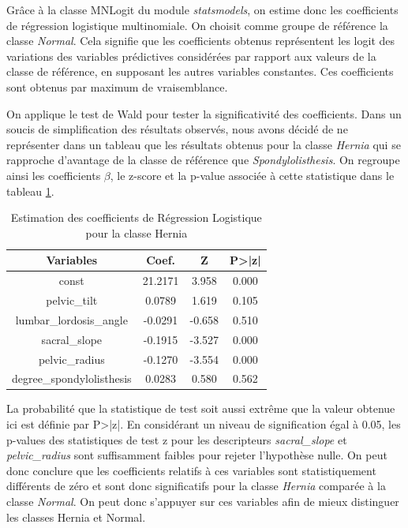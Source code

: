 \documentclass[twocolumn,10pt]{article}
\begin{document}
Grâce à la classe MNLogit du module \textit{statsmodels}, on estime donc les coefficients de régression logistique multinomiale. On choisit comme groupe de référence la classe \textit{Normal}. Cela signifie que les coefficients obtenus représentent les logit des variations des variables prédictives considérées par rapport aux valeurs de la classe de référence, en supposant les autres variables constantes. Ces coefficients sont obtenus par maximum de vraisemblance.

On applique le test de Wald pour tester la significativité des coefficients. Dans un soucis de simplification des résultats observés, nous avons décidé de ne représenter dans un tableau que les résultats obtenus pour la classe \textit{Hernia} qui se rapproche d'avantage de la classe de référence que \textit{Spondylolisthesis}. On regroupe ainsi les coefficients $\beta$, le z-score et la p-value associée à cette statistique dans le tableau \ref{tab:interpretations_coef_Hernia}.

\begin{table}[htbp]
    \begin{center}
        \caption{\label{tab:interpretations_coef_Hernia} Estimation des coefficients de Régression Logistique pour la classe Hernia}
        \begin{tabular}{c|ccc}
            Variables & Coef. & Z & P>|z| \\
            \hline
            const & 21.2171 & 3.958 & 0.000 \\
            pelvic\_tilt & 0.0789 & 1.619	 & 0.105\\
            lumbar\_lordosis\_angle & -0.0291 & -0.658 & 0.510\\
            sacral\_slope & -0.1915 & -3.527	& 0.000 \\
            pelvic\_radius & -0.1270 & -3.554 & 0.000	\\
			degree\_spondylolisthesis & 0.0283 & 0.580	& 0.562\\

        \end{tabular}
    \end{center}
\end{table}

La probabilité que la statistique de test soit aussi extrême que la valeur obtenue ici est définie par P>|z|. En considérant un niveau de signification égal à 0.05, les p-values des statistiques de test z pour les descripteurs \textit{sacral\_slope} et \textit{pelvic\_radius} sont suffisamment faibles pour rejeter l'hypothèse nulle. On peut donc conclure que les coefficients relatifs à ces variables sont statistiquement différents de zéro et sont donc significatifs pour la classe \textit{Hernia} comparée à la classe \textit{Normal}. On peut donc s'appuyer sur ces variables afin de mieux distinguer les classes Hernia et Normal.
\end{document}

